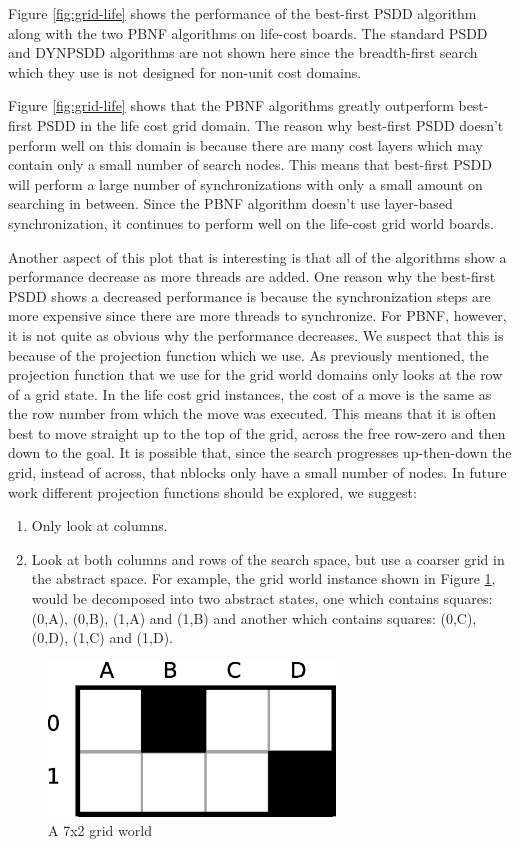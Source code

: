 \documentclass{article}
\begin{document}
Figure \ref{fig:grid-life} shows the performance of the best-first
PSDD algorithm along with the two PBNF algorithms on life-cost
boards.  The standard PSDD and DYNPSDD algorithms are not shown here
since the breadth-first search which they use is not designed for
non-unit cost domains.

Figure \ref{fig:grid-life} shows that the PBNF algorithms greatly
outperform best-first PSDD in the life cost grid domain.  The reason
why best-first PSDD doesn't perform well on this domain is because
there are many cost layers which may contain only a small number of
search nodes.  This means that best-first PSDD will perform a large
number of synchronizations with only a small amount on searching
in between.  Since the PBNF algorithm doesn't use layer-based
synchronization, it continues to perform well on the life-cost grid
world boards.

Another aspect of this plot that is interesting is that all of the
algorithms show a performance decrease as more threads are added.  One
reason why the best-first PSDD shows a decreased performance is
because the synchronization steps are more expensive since there are
more threads to synchronize.  For PBNF, however, it is not quite as
obvious why the performance decreases.  We suspect that this is
because of the projection function which we use.  As previously
mentioned, the projection function that we use for the grid world
domains only looks at the row of a grid state.  In the life cost grid
instances, the cost of a move is the same as the row number from which
the move was executed.  This means that it is often best to move
straight up to the top of the grid, across the free row-zero and then
down to the goal.  It is possible that, since the search progresses
up-then-down the grid, instead of across, that nblocks only have a
small number of nodes.  In future work different projection functions
should be explored, we suggest:
\begin{enumerate}
\item Only look at columns.
\item Look at both columns and rows of the search space, but use a
  coarser grid in the abstract space.  For example, the grid world
  instance shown in Figure \ref{fig:small-grid}, would be decomposed
  into two abstract states, one which contains squares: (0,A), (0,B),
  (1,A) and (1,B) and another which contains squares: (0,C), (0,D),
  (1,C) and (1,D).
\end{enumerate}

\begin{figure}[t]
\begin{center}
\includegraphics[width=3in]{images/grid-world-small.eps}
\caption{A 7x2 grid world}
\label{fig:small-grid}
\end{center}
\end{figure}
\end{document}
